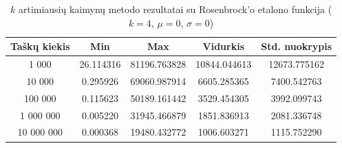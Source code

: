 \begin{table}[H]
    \centering
    \begin{tabular}{|c|c|c|c|c|}
        \hline
        \textbf{Taškų kiekis} & \textbf{Min} & \textbf{Max} & \textbf{Vidurkis} & \textbf{Std. nuokrypis} \\ \hline
        1 000        & 26.114316 & 81196.763828 & 10844.044613 & 12673.775162 \\ \hline
        10 000       & 0.295926 & 69060.987914 & 6605.285365 & 7400.542763 \\ \hline
        100 000      & 0.115623 & 50189.161442 & 3529.454305 & 3992.099743 \\ \hline
        1 000 000    & 0.005220 & 31945.466879 & 1851.836913 & 2081.336748 \\ \hline
        10 000 000   & 0.000368 & 19480.432772 & 1006.603271 & 1115.752290 \\ \hline
    \end{tabular}
    \caption{$k$ artimiausių kaimynų metodo rezultatai su Rosenbrock'o etalono funkcija ($k = 4$, $\mu = 0$, $\sigma = 0$)}
\end{table}